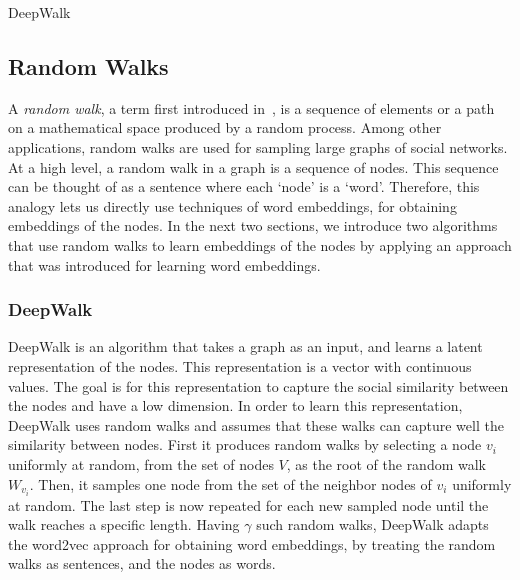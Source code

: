 DeepWalk\subsection{Random Walks}

A \emph{random walk}, a term first introduced in~\cite{pearson1905problem},
is a sequence of elements or a path on a mathematical space
produced by a random process. Among other applications, random walks are used
for sampling large graphs of social networks.
At a high level, a random walk in a graph is a sequence of nodes. This sequence
can be thought of as a sentence where each `node' is a `word'. Therefore, this
analogy lets us directly use techniques of word embeddings, for obtaining
embeddings of the nodes. In the next two sections, we introduce
two algorithms that use random walks to learn embeddings of the nodes
by applying an approach that was introduced for learning word embeddings.

\subsubsection{DeepWalk}

DeepWalk is an algorithm that takes a graph as an input, and learns a latent
representation of the nodes. This representation is a vector with continuous
values. The goal is for this representation to capture the social similarity
between the nodes and have a low dimension. In order to learn this
representation, DeepWalk uses random walks and assumes that these walks can
capture well the similarity between nodes. First it produces random walks by
selecting a node $v_i$ uniformly at random, from the set of nodes $V$, as the
root of the random walk $W_{v_i}$. Then, it samples one node from the set of the
neighbor nodes of $v_i$ uniformly at random. The last step is now repeated for
each new sampled node until the walk reaches a specific length. Having $\gamma$
such random walks, DeepWalk adapts the word2vec approach for obtaining word
embeddings, by treating the random walks as sentences, and the nodes as words.

